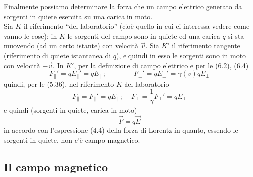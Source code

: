 Finalmente possiamo determinare la forza che un campo elettrico generato da
sorgenti in quiete esercita su una carica in moto.\\
Sia $K$ il riferimento ``del laboratorio'' (cio\`e quello in cui ci interessa
vedere come vanno le cose): in $K$ le sorgenti del campo sono in quiete ed una
carica $q$ si sta muovendo (ad un certo istante) con velocit\`a $\vec v$. Sia
$K'$ il riferimento tangente (riferimento di quiete istantanea di $q$), e quindi
in esso le sorgenti sono in moto con velocit\`a $-\vec v$. In $K'$, per la
definizione di campo elettrico e per le (6.2), (6.4)
\begin{equation}
  F_\parallel'=qE_\parallel'=qE_\parallel\,;
  \qquad\qquad F_\perp'=qE_\perp'=\gamma(v)qE_\perp
  \tag{6.5}
\end{equation}
quindi, per le (5.36), nel riferimento $K$ del laboratorio
\[
  F_\parallel=F_\parallel'=qE_\parallel\,;
  \quad\ F_\perp=\frac{1}{\gamma}F_\perp'=qE_\perp
\]
e quindi (sorgenti in quiete, carica in moto)
\begin{equation}
  \vec F=q\vec E
  \tag{6.6}
\end{equation}
in accordo con l'espressione (4.4) della forza di Lorentz in quanto, essendo le
sorgenti in quiete, non c'\`e campo magnetico.

\subsection{Il campo magnetico}

